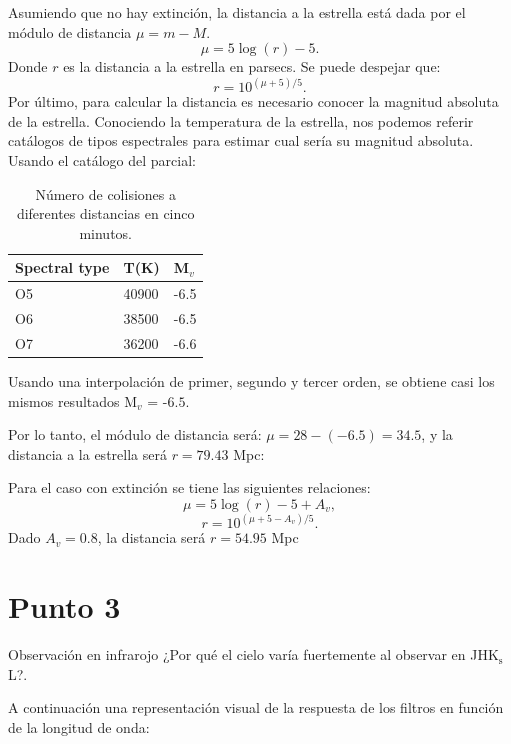 \documentclass[notitlepage,letterpaper,12pt]{article} %
\begin{document}
Asumiendo que no hay extinción, la distancia a la estrella está dada por el módulo de distancia $\mu = m-M$.
\begin{equation}
\mu = 5\log(r) - 5.
\end{equation}
Donde $r$ es la distancia a la estrella en parsecs.
Se puede despejar que:
\begin{equation}
r = 10^{(\mu +5)/5}.
\end{equation}
Por último, para calcular la distancia es necesario conocer la magnitud absoluta de la estrella.
Conociendo la temperatura de la estrella, nos podemos referir catálogos de tipos espectrales para estimar cual sería su magnitud absoluta.
Usando el catálogo del parcial:
\begin{table}[h!]
\centering
\begin{tabular}{|l|l|l|}
\hline
Spectral type & T(K) & M$_v$ \\ \hline
O5 & 40900 & -6.5  \\ \hline 
O6 & 38500 & -6.5  \\ \hline 
O7 & 36200 & -6.6  \\ \hline 
\end{tabular}
\caption{Número de colisiones a diferentes distancias en cinco minutos.}
\label{tiempoFijo}
\end{table}
\newpage
Usando una interpolación de primer, segundo y tercer orden, se obtiene casi los mismos resultados M$_v$ = -$6.5$.

Por lo tanto, el módulo de distancia será: $\mu = 28-(-6.5) = 34.5$, y la distancia a la estrella será $r = 79.43$ Mpc:


Para el caso con extinción se tiene las siguientes relaciones:
\begin{equation}
\mu = 5\log(r) - 5 + A_v,
\end{equation}
\begin{equation}
r = 10^{(\mu+5-A_v)/5}.
\end{equation}
Dado $A_v = 0.8$, la distancia será $r = 54.95$ Mpc

\section{Punto 3}
Observación en infrarojo ¿Por qué el cielo varía fuertemente al observar en JHK$_\text{s}$L?.

A continuación una representación visual de la respuesta de los filtros en función de la longitud de onda:
\end{document}
